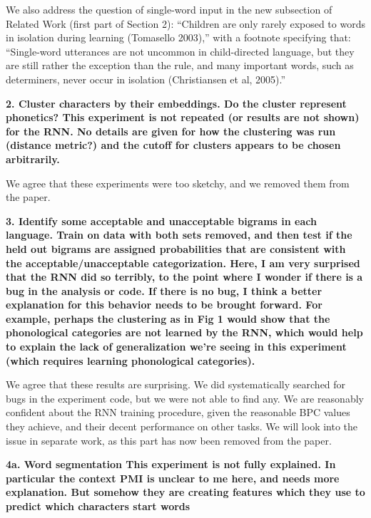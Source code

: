 \documentclass{article}
\begin{document}
We also address the question of single-word input in the new subsection of Related Work (first part of Section 2): ``Children are only rarely exposed to words in isolation during learning (Tomasello 2003),'' with a footnote specifying that: ``Single-word utterances are not uncommon in child-directed language, but they are still rather the exception than the rule, and many important words, such as determiners, never occur in isolation (Christiansen et al, 2005).''
\newline

\textbf{2. Cluster characters by their embeddings.  Do the cluster represent phonetics? This experiment is not repeated (or results are not shown) for the RNN.  No details are given for how the clustering was run (distance metric?) and the cutoff for clusters appears to be chosen arbitrarily.}

We agree that these experiments were too sketchy, and we removed them from the paper.
\newline

\textbf{3. Identify some acceptable and unacceptable bigrams in each language. Train on data with both sets removed, and then test if the held out bigrams
are assigned probabilities that are consistent with the acceptable/unacceptable categorization. Here, I am very surprised that the RNN did so terribly, to the point where I wonder if there is a bug in the analysis or code.  If there is no bug, I think a better explanation for this behavior needs to be brought forward. For example, perhaps the clustering as in Fig 1 would show that the phonological categories are not learned by the RNN, which would help to explain the lack of generalization we're seeing in this experiment (which requires learning phonological categories).}

We agree that these results are surprising. We did systematically searched for bugs in the experiment code, but we were not able to find any. We are reasonably confident about the RNN training procedure, given the reasonable BPC values they achieve, and their decent performance on other tasks. We will look into the issue in separate work, as this part has now been removed from the paper.
\newline

\textbf{4a. Word segmentation This experiment is not fully explained.  In particular the context PMI is unclear to me here, and needs more explanation.  But somehow they are creating features which they use to predict which characters start words}
\end{document}
